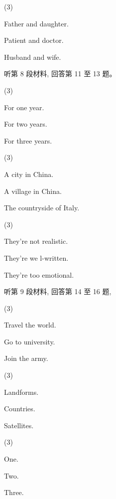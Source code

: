 \documentclass{英语试卷}
\begin{document}
\begin{choices}(3)
  \item Father and daughter.
  \item Patient and doctor.
  \item Husband and wife.
\end{choices}
\par 听第 8 段材料, 回答第 11 至 13 题。\par
{}
\begin{choices}(3)
  \item For one year.
  \item For two years.
  \item For three years.
\end{choices}
\begin{choices}(3)
  \item A city in China.
  \item A village in China.
  \item The countryside of Italy.
\end{choices}
\begin{choices}(3)
  \item They're not realistic.
  \item They're we l-written.
  \item They're too emotional.
\end{choices}
\par 听第 9 段材料, 回答第 14 至 16 题,\par
{}
\begin{choices}(3)
  \item Travel the world.
  \item Go to university.
  \item Join the army.
\end{choices}
\begin{choices}(3)
  \item Landforms.
  \item Countries.
  \item Satellites.
\end{choices}
\begin{choices}(3)
  \item One.
  \item Two.
  \item Three.
\end{choices}
\end{document}

